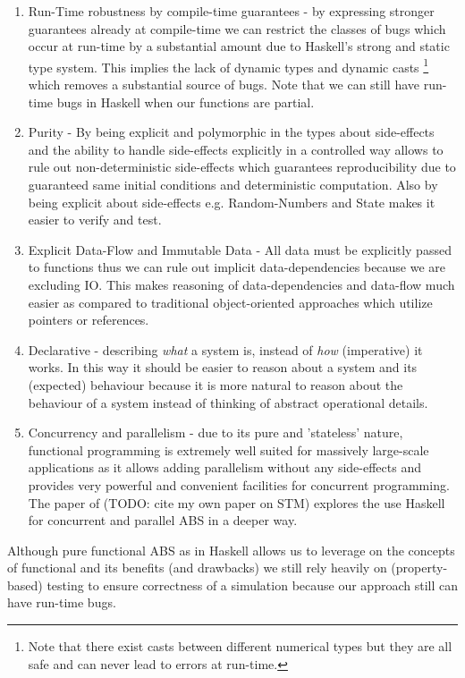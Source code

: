 \begin{enumerate}
	\item Run-Time robustness by compile-time guarantees - by expressing stronger guarantees already at compile-time we can restrict the classes of bugs which occur at run-time by a substantial amount due to Haskell's strong and static type system.  This implies the lack of dynamic types and dynamic casts \footnote{Note that there exist casts between different numerical types but they are all safe and can never lead to errors at run-time.} which removes a substantial source of bugs.  Note that we can still have run-time bugs in Haskell when our functions are partial.
	\item Purity - By being explicit and polymorphic in the types about side-effects and the ability to handle side-effects explicitly in a controlled way allows to rule out non-deterministic side-effects which guarantees reproducibility due to guaranteed same initial conditions and deterministic computation. Also by being explicit about side-effects e.g. Random-Numbers and State makes it easier to verify and test.
	\item Explicit Data-Flow and Immutable Data - All data must be explicitly passed to functions thus we can rule out implicit data-dependencies because we are excluding IO. This makes reasoning of data-dependencies and data-flow much easier as compared to traditional object-oriented approaches which utilize pointers or references.
	\item Declarative - describing \textit{what} a system is, instead of \textit{how} (imperative) it works. In this way it should be easier to reason about a system and its (expected) behaviour because it is more natural to reason about the behaviour of a system instead of thinking of abstract operational details.
	\item Concurrency and parallelism - due to its pure and 'stateless' nature, functional programming is extremely well suited for massively large-scale applications as it allows adding parallelism without any side-effects and provides very powerful and convenient facilities for concurrent programming. The paper of (TODO: cite my own paper on STM) explores the use Haskell for concurrent and parallel ABS in a deeper way.
\end{enumerate}

Although pure functional ABS as in Haskell allows us to leverage on the concepts of functional and its benefits (and drawbacks) we still rely heavily on (property-based) testing to ensure correctness of a simulation because our approach still can have run-time bugs.

